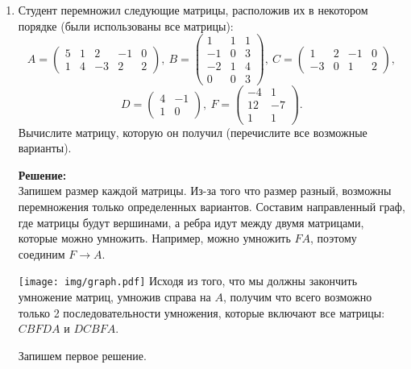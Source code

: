 \documentclass[a4paper,12pt]{article}
\begin{document}
\begin{enumerate}
\vspace{5pt}
\item Студент перемножил следующие матрицы, расположив их в некотором порядке (были использованы все матрицы):
$$
A = 
\begin{pmatrix}
5 & 1 & 2 & -1 & 0\\
1 & 4 & -3 & 2 & 2
\end{pmatrix}, \
B =\begin{pmatrix}
1 & 1 & 1\\
-1 & 0 & 3\\
-2 & 1 & 4\\
0 & 0 & 3
\end{pmatrix}, \
C = \begin{pmatrix}
1 & 2 & -1 & 0\\
-3 & 0 & 1 & 2
\end{pmatrix},$$
$$
D = 
\begin{pmatrix}
4 & -1\\
1 & 0
\end{pmatrix}, \
F = \begin{pmatrix}
-4 & 1\\
12 & -7\\
1 & 1
\end{pmatrix}.
$$
Вычислите матрицу, которую он получил (перечислите все возможные варианты).

\textbf{Решение:}\\
Запишем размер каждой матрицы. Из-за того что размер разный, возможны перемножения только определенных вариантов. Составим направленный граф, где матрицы будут вершинами, а ребра идут между двумя матрицами, которые можно умножить. Например, можно умножить $FA$, поэтому соединим $F\rightarrow A$.

\texttt{[image: img/graph.pdf]}
Исходя из того, что мы должны закончить умножение матриц, умножив справа на $A$, получим что всего возможно только 2 последовательности умножения, которые включают все матрицы: $CBFDA$ и $DCBFA$.

Запишем первое решение.


\end{enumerate}
\end{document}
